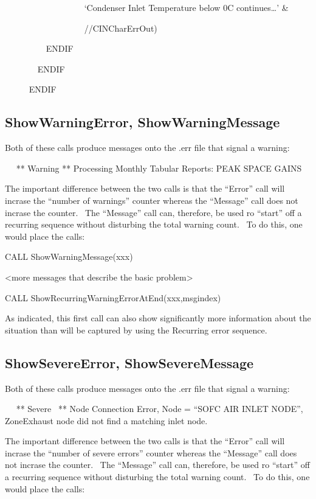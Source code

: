 ~~~~~~~~~~~~~~~~~~ `Condenser Inlet Temperature below 0C continues\ldots{}' \&

~~~~~~~~~~ ~~~~~~~~//CINCharErrOut)

~~~~~~~~~ ENDIF

~~~~~~~ ENDIF

~~~~~ ENDIF

\subsection{ShowWarningError, ShowWarningMessage}\label{showwarningerror-showwarningmessage}

Both of these calls produce messages onto the .err file that signal a warning:

~~ ** Warning ** Processing Monthly Tabular Reports: PEAK SPACE GAINS

The important difference between the two calls is that the ``Error'' call will incrase the ``number of warnings'' counter whereas the ``Message'' call does not incrase the counter.~ The ``Message'' call can, therefore, be used ro ``start'' off a recurring sequence without disturbing the total warning count.~ To do this, one would place the calls:

CALL ShowWarningMessage(xxx)

\textless{}more messages that describe the basic problem\textgreater{}

CALL ShowRecurringWarningErrorAtEnd(xxx,msgindex)

As indicated, this first call can also show significantly more information about the situation than will be captured by using the Recurring error sequence.

\subsection{ShowSevereError, ShowSevereMessage}\label{showsevereerror-showseveremessage}

Both of these calls produce messages onto the .err file that signal a warning:

~~ ** Severe~ ** Node Connection Error, Node = ``SOFC AIR INLET NODE'', ZoneExhaust node did not find a matching inlet node.

The important difference between the two calls is that the ``Error'' call will incrase the ``number of severe errors'' counter whereas the ``Message'' call does not incrase the counter.~ The ``Message'' call can, therefore, be used ro ``start'' off a recurring sequence without disturbing the total warning count.~ To do this, one would place the calls:


